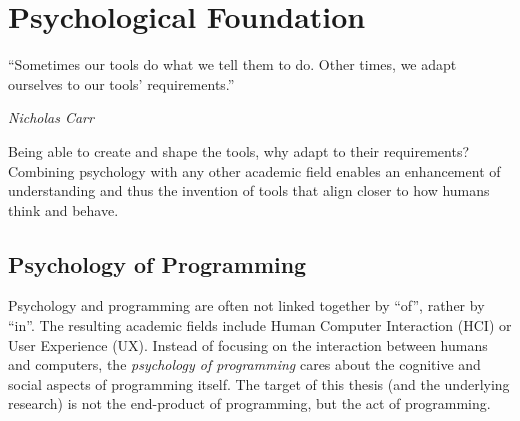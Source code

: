 \chapter{Psychological Foundation}
\label{chap:psychological-foundation}
\epigraph{``Sometimes our tools do what we tell them to do. Other times, we adapt ourselves to our tools’ requirements.''}{\textit{Nicholas Carr}}
\noindent
Being able to create and shape the tools, why adapt to their requirements?
Combining psychology with any other academic field enables an enhancement of understanding and thus the invention of tools that align closer to how humans think and behave.

\section{Psychology of Programming}
\label{sec:psychology-of-programming}
Psychology and programming are often not linked together by ``of'', rather by ``in''.
The resulting academic fields include Human Computer Interaction (HCI) or User Experience (UX).
Instead of focusing on the interaction between humans and computers, the \emph{psychology of programming} cares about the cognitive and social aspects of programming itself.
The target of this thesis (and the underlying research) is not the end-product of programming, but the act of programming.

